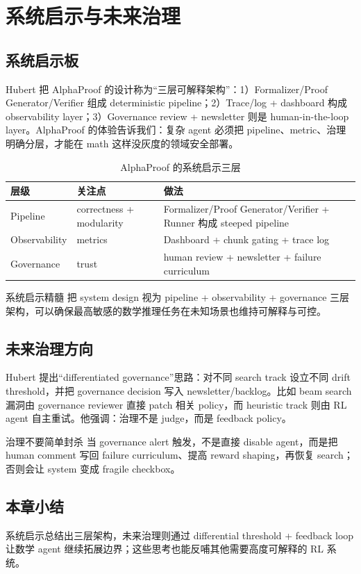 \section{系统启示与未来治理}

\subsection{系统启示板}
Hubert 把 AlphaProof 的设计称为“三层可解释架构”：1）Formalizer/Proof Generator/Verifier 组成 deterministic pipeline；2）Trace/log + dashboard 构成 observability layer；3）Governance review + newsletter 则是 human-in-the-loop layer。AlphaProof 的体验告诉我们：复杂 agent 必须把 pipeline、metric、治理明确分层，才能在 math 这样没灰度的领域安全部署。

\begin{table}[H]
\centering
\begin{tabular}{p{3cm}p{4cm}p{5cm}}
\toprule
层级 & 关注点 & 做法 \\
\midrule
Pipeline & correctness + modularity & Formalizer/Proof Generator/Verifier + Runner 构成 steeped pipeline \\
Observability & metrics & Dashboard + chunk gating + trace log \\
Governance & trust & human review + newsletter + failure curriculum \\
\bottomrule
\end{tabular}
\caption{AlphaProof 的系统启示三层}
\end{table}

\begin{knowledgebox}{系统启示精髓}
把 system design 视为 pipeline + observability + governance 三层架构，可以确保最高敏感的数学推理任务在未知场景也维持可解释与可控。
\end{knowledgebox}

\subsection{未来治理方向}
Hubert 提出“differentiated governance”思路：对不同 search track 设立不同 drift threshold，并把 governance decision 写入 newsletter/backlog。比如 beam search 漏洞由 governance reviewer 直接 patch 相关 policy，而 heuristic track 则由 RL agent 自主重试。他强调：治理不是 judge，而是 feedback policy。

\begin{warningbox}{治理不要简单封杀}
当 governance alert 触发，不是直接 disable agent，而是把 human comment 写回 failure curriculum、提高 reward shaping，再恢复 search；否则会让 system 变成 fragile checkbox。
\end{warningbox}

\subsection{本章小结}
系统启示总结出三层架构，未来治理则通过 differential threshold + feedback loop 让数学 agent 继续拓展边界；这些思考也能反哺其他需要高度可解释的 RL 系统。
\newpage

